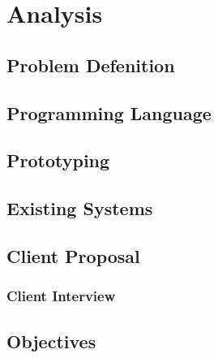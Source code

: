 \section{Analysis}
\subsection{Problem Defenition}
\subsection{Programming Language}
\subsection{Prototyping}
\subsection{Existing Systems}
\subsection{Client Proposal}
\subsubsection{Client Interview}
\subsection{Objectives}